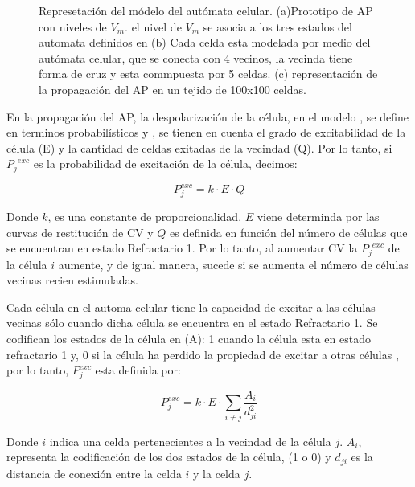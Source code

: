   \begin{figure}
\centering
\caption{Represetación del módelo del autómata celular. (a)Prototipo de \ac{AP}
con niveles de $V_m$. el nivel de $V_m$ se asocia a los tres estados del
automata definidos en \cite{Alonso-Atienza05} (b) Cada celda esta modelada por
medio del autómata celular, que se conecta con 4 vecinos, la vecinda  tiene
forma de cruz  y esta commpuesta por 5 celdas. (c) representación de la propagación
del \ac{AP} en un tejido de 100x100 celdas.}
  \label{fig:automata1}
\end{figure}

En la propagación del \ac{AP}, la despolarización de la célula, en el modelo
\cite{Alonso-Atienza05}, se define en terminos probabilísticos y , se tienen en
cuenta el grado de excitabilidad de la célula (E) y la cantidad de celdas
exitadas de la vecindad (Q). Por lo tanto, si ${P_{j}}^{exc}$ es la
probabilidad de excitación de la célula, decimos:

\begin{equation}\label{eq:Propaga}
P_j^{exc}= k\cdot E\cdot Q
\end{equation}

Donde $k$, es una constante de proporcionalidad. $E$ viene determinda por las
curvas de restitución de \ac{CV} y $Q$ es definida en función del número de
células que se encuentran en estado Refractario 1. Por lo tanto, al aumentar
\ac{CV} la ${P_{j}}^{exc}$ de la célula $i$ aumente, y de igual manera, sucede
si se aumenta el número de células vecinas recien estimuladas.

Cada célula en el automa celular tiene la capacidad de excitar a las
células vecinas sólo cuando dicha célula se encuentra en el estado
Refractario 1. Se codifican los estados de la célula en (A):
1 cuando la célula esta en estado refractario 1 y, 0 si la
célula ha perdido la propiedad de excitar a otras células
\cite{Alonso-Atienza05}, por lo tanto, $P_j^{exc}$ esta definida por:


\begin{equation}\label{eq:Propaga2}
P_j^{exc}= k \cdot E\cdot\sum_{i \neq j}\frac{A_i}{d_{ji}^2}
\end{equation}

Donde $i$ indica una celda pertenecientes a la vecindad de la célula $j$. $A_i$,
representa la codificación de los dos estados de la célula, (1 o 0) y $d_{ji}$
es la distancia de conexión entre la celda $i$ y la celda $j$.


